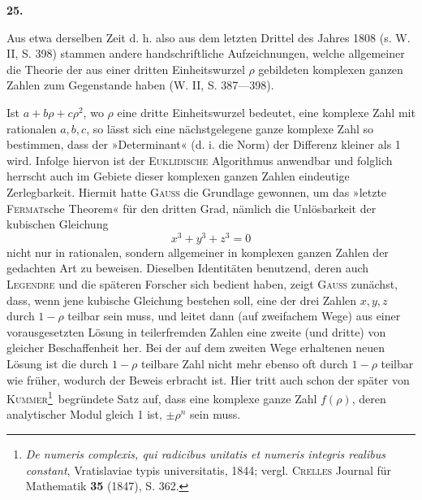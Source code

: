 \begin{center}\bfseries 25.\end{center}
\noindent\hspace*{\parindent}Aus etwa derselben Zeit d. h. also aus dem letzten Drittel des Jahres 1808 (s. W. II, S. 398) stammen andere handschriftliche Aufzeichnungen, welche allgemeiner die Theorie der aus einer dritten Einheitswurzel \(\rho\) gebildeten komplexen ganzen Zahlen zum Gegenstande haben (W. II, S. 387—398).

Ist \(a+b\rho+c\rho^2\), wo \(\rho\) eine dritte Einheitswurzel bedeutet, eine komplexe Zahl mit rationalen \(a,b,c\), so lässt sich eine nächstgelegene ganze komplexe
\newpage{}
\noindent Zahl so bestimmen, dass der »Determinant« (d. i. die Norm) der Differenz kleiner als 1 wird. Infolge hiervon ist der \textsc{Euklidische} Algorithmus anwendbar und folglich herrscht auch im Gebiete dieser komplexen ganzen Zahlen eindeutige Zerlegbarkeit. Hiermit hatte \textsc{Gauss} die Grundlage gewonnen, um das »letzte \textsc{Fermat}sche Theorem« für den dritten Grad, nämlich die Unlösbarkeit der kubischen Gleichung
\[
x^3+y^3+z^3=0
\]
nicht nur in rationalen, sondern allgemeiner in komplexen ganzen Zahlen der gedachten Art zu beweisen. Dieselben Identitäten benutzend, deren auch \textsc{Legendre} und die späteren Forscher sich bedient haben, zeigt \textsc{Gauss} zunächst, dass, wenn jene kubische Gleichung bestehen soll, eine der drei Zahlen \(x,y,z\) durch \(1-\rho\) teilbar sein muss, und leitet dann (auf zweifachem Wege) aus einer vorausgesetzten Lösung in teilerfremden Zahlen eine zweite (und dritte) von gleicher Beschaffenheit her. Bei der auf dem zweiten Wege erhaltenen neuen Lösung ist die durch \(1-\rho\) teilbare Zahl nicht mehr ebenso oft durch \(1-\rho\) teilbar wie früher, wodurch der Beweis erbracht ist. Hier tritt auch schon der später von \textsc{Kummer}\footnote{\textit{De numeris complexis, qui radicibus unitatis et numeris integris realibus constant}, Vratislaviae typis universitatis, 1844; vergl. \textsc{Crelles} Journal für Mathematik \textbf{35} (1847), S. 362.}\ begründete Satz auf, dass eine komplexe ganze Zahl \(f(\rho)\), deren analytischer Modul gleich 1 ist, \(\pm\rho^n\) sein muss.

